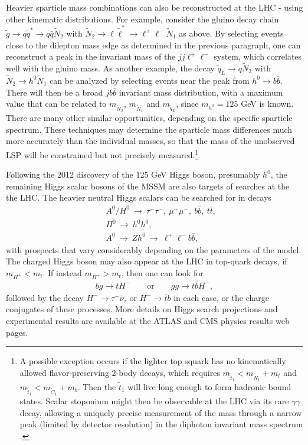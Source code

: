 \documentclass[11pt]{article}
\def\beq{\begin{eqnarray}}
\def\eeq{\end{eqnarray}}
\def\stilde{\widetilde}
\begin{document}
Heavier sparticle mass combinations can also be reconstructed at the LHC 
\cite{ATLASTDR}-\cite{Kawagoe}
using other kinematic 
distributions. For example, consider the gluino decay chain $\stilde g 
\rightarrow q \stilde q^* \rightarrow q \bar q \stilde N_2$ with $\stilde 
N_2 \rightarrow \ell \stilde \ell^* \rightarrow \ell^+ \ell^- \stilde N_1$ 
as above. By selecting events close to the dilepton mass edge as 
determined in the previous paragraph, one can reconstruct a peak in the 
invariant mass of the $jj\ell^+\ell^-$ system, which correlates well with 
the gluino mass. As another example, the decay $\stilde q_L \rightarrow q 
\stilde N_2$ with $\stilde N_2 \rightarrow h^0 \stilde N_1$ can be 
analyzed by selecting events near the peak from $h^0 \rightarrow b 
\overline b$. There will then be a broad $jb\bar b$ invariant mass 
distribution, with a maximum value that can be related to $m_{\tilde 
N_2}$, $m_{\tilde N_1}$ and $m_{\tilde q_L}$, since $m_{h^0} = 125$ GeV is known. 
There are many other similar opportunities, depending on the specific sparticle 
spectrum. These techniques may determine the sparticle mass 
differences much more accurately than the individual masses, so that the mass of 
the unobserved LSP will be constrained but not precisely 
measured.\footnote{A possible exception occurs if the lighter 
top squark has no 
kinematically allowed flavor-preserving 2-body decays, which requires
$m_{\tilde t_1} < m_{\tilde N_1} + m_t$ and 
$m_{\tilde t_1} < m_{\tilde C_1} + m_b$. Then the $\tilde t_1$ will 
live long enough to form
hadronic bound states. Scalar stoponium
might then be observable at the LHC via its rare $\gamma\gamma$ decay,
allowing a uniquely precise measurement of the mass through
a narrow peak (limited by detector resolution) in the diphoton
invariant mass spectrum \cite{Drees:1993yr,stoponium2}.}

Following the 2012 discovery of the 125 GeV Higgs boson, presumably $h^0$, the remaining
Higgs scalar bosons of the MSSM are also targets of searches at the 
the LHC. The heavier neutral Higgs scalars can be searched for in decays
\beq
&&
A^0/H^0 \>\rightarrow\> \tau^+\tau^-,\> \mu^+\mu^-,\> b\overline 
b,\>t\overline t,
\\
&&
H^0 \>\rightarrow\> h^0 h^0,
\\
&&
A^0 \>\rightarrow\> Z h^0 \>\rightarrow\> \ell^+ \ell^- b \overline b,
\eeq
with prospects that vary considerably depending on the parameters of the 
model. The charged Higgs boson may also appear at the LHC in 
top-quark decays, if $m_{H^+} < m_t$. 
If instead $m_{H^+} > m_t$, then one can look for
\beq
bg \rightarrow t H^-
\qquad\mbox{or}\qquad
gg \rightarrow t \overline b H^-,
\eeq
followed by the decay $H^- \rightarrow \tau^- \bar \nu_\tau$ or
$H^- \rightarrow \bar t b$ in each case, or the charge conjugates of these processes. 
More details on Higgs search projections and experimental results are 
available at the ATLAS and CMS physics results web pages.
\end{document}
